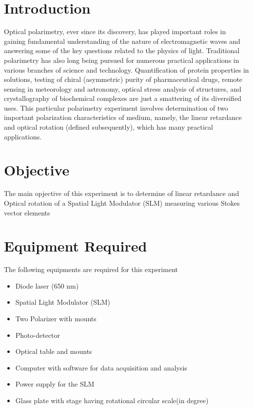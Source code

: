 
\renewcommand{\arraystretch}{1.5} %

\section{Introduction}
Optical polarimetry, ever since its discovery, has played important roles in gaining fundamental understanding of the nature of electromagnetic waves and answering some of the key questions related to the physics of light. Traditional polarimetry has also long being pursued for numerous practical applications in various branches of science and technology. Quantification of protein properties in solutions, testing of chiral (asymmetric) purity of pharmaceutical drugs, remote sensing in meteorology and astronomy, optical stress analysis of structures, and crystallography of biochemical complexes are just a smattering of its diversified uses. This particular polarimetry experiment involves determination of two important polarization characteristics of medium, namely, the linear retardance and optical rotation (defined subsequently), which has many practical applications.
\section{Objective}
The main opjective of this experiment is to determine of linear retardance and Optical rotation of a Spatial Light Modulator (SLM) measuring various Stokes vector elements
\section{Equipment Required}
The following equipments are required for this experiment
\begin{itemize}
    \item Diode laser (650 nm)
    \item Spatial Light Modulator (SLM)
    \item Two Polarizer with mounts
    \item Photo-detector
    \item Optical table and mounts
    \item Computer with software for data acquisition and analysis
    \item Power supply for the SLM
    \item Glass plate with stage having rotational circular scale(in degree)
\end{itemize}
